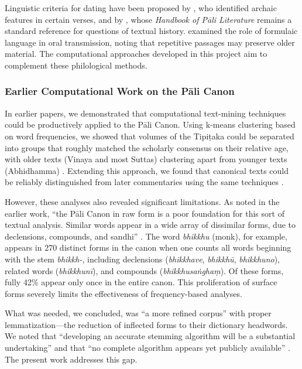 \documentclass[unnumsec,webpdf,contemporary,large]{oup-authoring-template}
\begin{document}
Linguistic criteria for dating have been proposed by \citet{norman1983,norman1997}, who identified archaic features in certain verses, and by \citet{vonhinuber1996}, whose \emph{Handbook of Pāli Literature} remains a standard reference for questions of textual history. \citet{collins1992} examined the role of formulaic language in oral transmission, noting that repetitive passages may preserve older material. The computational approaches developed in this project aim to complement these philological methods.

\subsubsection{Earlier Computational Work on the Pāli Canon}

In earlier papers, we demonstrated that computational text-mining techniques could be productively applied to the Pāli Canon. Using k-means clustering based on word frequencies, we showed that volumes of the Tipiṭaka could be separated into groups that roughly matched the scholarly consensus on their relative age, with older texts (Vinaya and most Suttas) clustering apart from younger texts (Abhidhamma) \citep{zigmond2021}. Extending this approach, we found that canonical texts could be reliably distinguished from later commentaries using the same techniques \citep{zigmond2023}.

However, these analyses also revealed significant limitations. As noted in the earlier work, ``the Pāli Canon in raw form is a poor foundation for this sort of textual analysis. Similar words appear in a wide array of dissimilar forms, due to declensions, compounds, and sandhi'' \citep{zigmond2023}. The word \emph{bhikkhu} (monk), for example, appears in 270 distinct forms in the canon when one counts all words beginning with the stem \emph{bhikkh-}, including declensions (\emph{bhikkhave}, \emph{bhikkhū}, \emph{bhikkhuno}), related words (\emph{bhikkhunī}), and compounds (\emph{bhikkhusaṅghaṃ}). Of these forms, fully 42\% appear only once in the entire canon. This proliferation of surface forms severely limits the effectiveness of frequency-based analyses.

What was needed, we concluded, was ``a more refined corpus'' with proper lemmatization—the reduction of inflected forms to their dictionary headwords. We noted that ``developing an accurate stemming algorithm will be a substantial undertaking'' and that ``no complete algorithm appears yet publicly available'' \citep{zigmond2021}. The present work addresses this gap.
\end{document}
